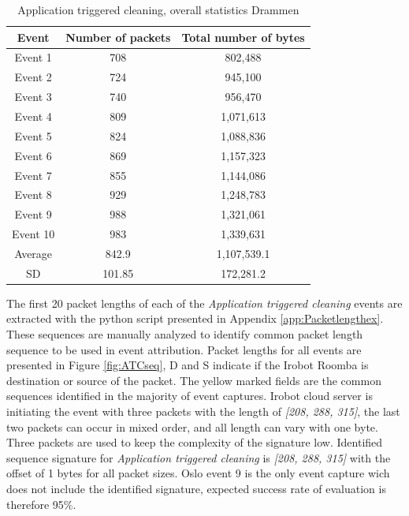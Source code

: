\begin{table}[H]
\centering
\caption{Application triggered cleaning, overall statistics Drammen}
\label{tab:TCoverallDRA}
\begin{tabular}{|c|c|c|}
\hline
\textbf{Event} & \textbf{Number of packets} & \textbf{Total number of bytes} \\ \hline
Event 1        & 708                    & 802,488                    \\ \hline
Event 2        & 724                    & 945,100                    \\ \hline
Event 3        & 740                    & 956,470                    \\ \hline
Event 4        & 809                    & 1,071,613                   \\ \hline
Event 5        & 824                    & 1,088,836                   \\ \hline
Event 6        & 869                    & 1,157,323                   \\ \hline
Event 7        & 855                    & 1,144,086                   \\ \hline
Event 8        & 929                    & 1,248,783                   \\ \hline
Event 9        & 988                    & 1,321,061                   \\ \hline
Event 10       & 983                    & 1,339,631                   \\ \hline
Average        & 842.9                  & 1,107,539.1                 \\ \hline
SD        & 101.85
       & 172,281.2               \\ \hline
\end{tabular}
\end{table}

The first 20 packet lengths of each of the \textit{Application triggered cleaning} events are extracted with the python script presented in Appendix \ref{app:Packetlengthex}. These sequences are manually analyzed to identify common packet length sequence to be used in event attribution. Packet lengths for all events are presented in Figure \ref{fig:ATCseq}, D and S indicate if the Irobot Roomba is destination or source of the packet. The yellow marked fields are the common sequences identified in the majority of event captures. Irobot cloud server is initiating the event with three packets with the length of \textit{[208, 288, 315]}, the last two packets can occur in mixed order, and all length can vary with one byte. Three packets are used to keep the complexity of the signature low. Identified sequence signature for \textit{Application triggered cleaning} is \textit{[208, 288, 315]} with the offset of 1 bytes for all packet sizes. Oslo event 9 is the only event capture wich does not include the identified signature, expected success rate of evaluation is therefore 95\%. 

